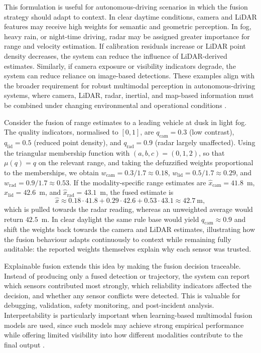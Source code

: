 \documentclass[graybox,envcountchap]{style/SNmono}
\begin{document}
This formulation is useful for autonomous-driving scenarios in which the fusion strategy should adapt to context. In clear daytime conditions, camera and LiDAR features may receive high weights for semantic and geometric perception. In fog, heavy rain, or night-time driving, radar may be assigned greater importance for range and velocity estimation. If calibration residuals increase or LiDAR point density decreases, the system can reduce the influence of LiDAR-derived estimates. Similarly, if camera exposure or visibility indicators degrade, the system can reduce reliance on image-based detections. These examples align with the broader requirement for robust multimodal perception in autonomous-driving systems, where camera, LiDAR, radar, inertial, and map-based information must be combined under changing environmental and operational conditions \cite{khaleghi_multisensor_2013, baltrusaitis_multimodal_2019}.


\begin{example}
Consider the fusion of range estimates to a leading vehicle at dusk in light fog. The quality indicators, normalised to $[0,1]$, are $q_{\mathrm{cam}}=0.3$ (low contrast), $q_{\mathrm{lid}}=0.5$ (reduced point density), and $q_{\mathrm{rad}}=0.9$ (radar largely unaffected). Using the triangular membership function with $(a,b,c)=(0,1,2)$, so that $\mu(q)=q$ on the relevant range, and taking the defuzzified weights proportional to the memberships, we obtain $w_{\mathrm{cam}}=0.3/1.7\approx0.18$, $w_{\mathrm{lid}}=0.5/1.7\approx0.29$, and $w_{\mathrm{rad}}=0.9/1.7\approx0.53$. If the modality-specific range estimates are $\hat{x}_{\mathrm{cam}}=41.8$~m, $\hat{x}_{\mathrm{lid}}=42.6$~m, and $\hat{x}_{\mathrm{rad}}=43.1$~m, the fused estimate is
\begin{equation*}
\hat{x} \approx 0.18\cdot41.8 + 0.29\cdot42.6 + 0.53\cdot43.1 \approx 42.7~\mathrm{m},
\end{equation*}
which is pulled towards the radar reading, whereas an unweighted average would return $42.5$~m. In clear daylight the same rule base would yield $q_{\mathrm{cam}}\approx0.9$ and shift the weights back towards the camera and LiDAR estimates, illustrating how the fusion behaviour adapts continuously to context while remaining fully auditable: the reported weights themselves explain why each sensor was trusted.
\end{example}


Explainable fusion extends this idea by making the fusion decision traceable. Instead of producing only a fused detection or trajectory, the system can report which sensors contributed most strongly, which reliability indicators affected the decision, and whether any sensor conflicts were detected. This is valuable for debugging, validation, safety monitoring, and post-incident analysis. Interpretability is particularly important when learning-based multimodal fusion models are used, since such models may achieve strong empirical performance while offering limited visibility into how different modalities contribute to the final output \cite{baltrusaitis_multimodal_2019}.
\end{document}
